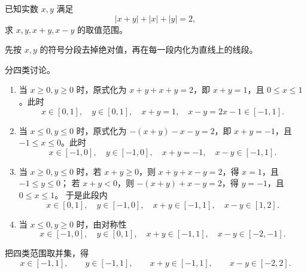 \begin{example}
  已知实数 \(x,y\) 满足
  \[
  |x+y|+|x|+|y|=2,
  \]
  求 \(x,y,x+y,x-y\) 的取值范围。
\end{example}
\begin{analyse}
  先按 \(x,y\) 的符号分段去掉绝对值，再在每一段内化为直线上的线段。
\end{analyse}
\begin{jie}
  分四类讨论。
  \begin{enumerate}
    \item 当 \(x\ge 0,y\ge 0\) 时，原式化为 \(x+y+x+y=2\)，即 \(x+y=1\)，且 \(0\le x\le 1\)。此时
    \[
    x\in[0,1],\quad y\in[0,1],\quad x+y=1,\quad x-y=2x-1\in[-1,1].
    \]
    \item 当 \(x\le 0,y\le 0\) 时，原式化为 \(-(x+y)-x-y=2\)，即 \(x+y=-1\)，且 \(-1\le x\le 0\)。此时
    \[
    x\in[-1,0],\quad y\in[-1,0],\quad x+y=-1,\quad x-y\in[-1,1].
    \]
    \item 当 \(x\ge 0,y\le 0\) 时，若 \(x+y\ge 0\)，则 \(x+y+x-y=2\)，得 \(x=1\)，且 \(-1\le y\le 0\)；
    若 \(x+y<0\)，则 \(-(x+y)+x-y=2\)，得 \(y=-1\)，且 \(0\le x\le 1\)。
    于是此段内
    \[
    x\in[0,1],\quad y\in[-1,0],\quad x+y\in[-1,1],\quad x-y\in[1,2].
    \]
    \item 当 \(x\le 0,y\ge 0\) 时，由对称性
    \[
    x\in[-1,0],\quad y\in[0,1],\quad x+y\in[-1,1],\quad x-y\in[-2,-1].
    \]
  \end{enumerate}
  把四类范围取并集，得
  \[
  x\in[-1,1],\qquad y\in[-1,1],\qquad x+y\in[-1,1],\qquad x-y\in[-2,2].
  \]
\end{jie}


